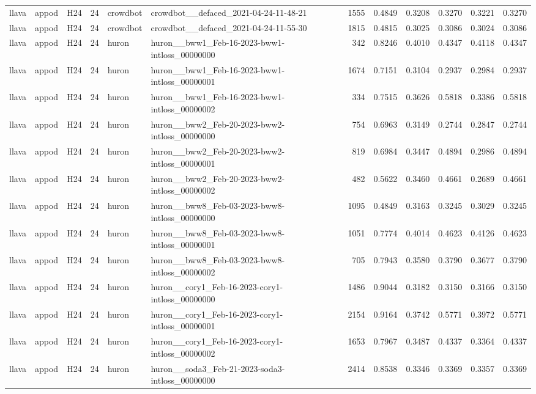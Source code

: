 \begin{table}[tbp]
\begin{tabular}{lllrllrrrrrr}
llava & appod & H24 & 24 & crowdbot & crowdbot\_\_defaced\_2021-04-24-11-48-21 & 1555 & 0.4849 & 0.3208 & 0.3270 & 0.3221 & 0.3270 \\
llava & appod & H24 & 24 & crowdbot & crowdbot\_\_defaced\_2021-04-24-11-55-30 & 1815 & 0.4815 & 0.3025 & 0.3086 & 0.3024 & 0.3086 \\
llava & appod & H24 & 24 & huron & huron\_\_bww1\_Feb-16-2023-bww1-intloss\_00000000 & 342 & 0.8246 & 0.4010 & 0.4347 & 0.4118 & 0.4347 \\
llava & appod & H24 & 24 & huron & huron\_\_bww1\_Feb-16-2023-bww1-intloss\_00000001 & 1674 & 0.7151 & 0.3104 & 0.2937 & 0.2984 & 0.2937 \\
llava & appod & H24 & 24 & huron & huron\_\_bww1\_Feb-16-2023-bww1-intloss\_00000002 & 334 & 0.7515 & 0.3626 & 0.5818 & 0.3386 & 0.5818 \\
llava & appod & H24 & 24 & huron & huron\_\_bww2\_Feb-20-2023-bww2-intloss\_00000000 & 754 & 0.6963 & 0.3149 & 0.2744 & 0.2847 & 0.2744 \\
llava & appod & H24 & 24 & huron & huron\_\_bww2\_Feb-20-2023-bww2-intloss\_00000001 & 819 & 0.6984 & 0.3447 & 0.4894 & 0.2986 & 0.4894 \\
llava & appod & H24 & 24 & huron & huron\_\_bww2\_Feb-20-2023-bww2-intloss\_00000002 & 482 & 0.5622 & 0.3460 & 0.4661 & 0.2689 & 0.4661 \\
llava & appod & H24 & 24 & huron & huron\_\_bww8\_Feb-03-2023-bww8-intloss\_00000000 & 1095 & 0.4849 & 0.3163 & 0.3245 & 0.3029 & 0.3245 \\
llava & appod & H24 & 24 & huron & huron\_\_bww8\_Feb-03-2023-bww8-intloss\_00000001 & 1051 & 0.7774 & 0.4014 & 0.4623 & 0.4126 & 0.4623 \\
llava & appod & H24 & 24 & huron & huron\_\_bww8\_Feb-03-2023-bww8-intloss\_00000002 & 705 & 0.7943 & 0.3580 & 0.3790 & 0.3677 & 0.3790 \\
llava & appod & H24 & 24 & huron & huron\_\_cory1\_Feb-16-2023-cory1-intloss\_00000000 & 1486 & 0.9044 & 0.3182 & 0.3150 & 0.3166 & 0.3150 \\
llava & appod & H24 & 24 & huron & huron\_\_cory1\_Feb-16-2023-cory1-intloss\_00000001 & 2154 & 0.9164 & 0.3742 & 0.5771 & 0.3972 & 0.5771 \\
llava & appod & H24 & 24 & huron & huron\_\_cory1\_Feb-16-2023-cory1-intloss\_00000002 & 1653 & 0.7967 & 0.3487 & 0.4337 & 0.3364 & 0.4337 \\
llava & appod & H24 & 24 & huron & huron\_\_soda3\_Feb-21-2023-soda3-intloss\_00000000 & 2414 & 0.8538 & 0.3346 & 0.3369 & 0.3357 & 0.3369 \\

\end{tabular}
\end{table}
